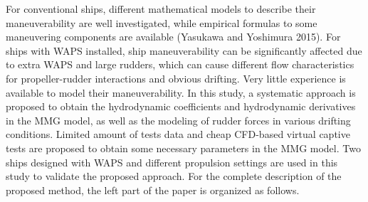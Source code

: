 For conventional ships, different mathematical models to describe their maneuverability are well investigated, while empirical formulas to some maneuvering components are available (Yasukawa and Yoshimura 2015). For ships with WAPS installed, ship maneuverability can be significantly affected due to extra WAPS and large rudders, which can cause different flow characteristics for propeller-rudder interactions and obvious drifting. Very little experience is available to model their maneuverability. In this study, a systematic approach is proposed to obtain the hydrodynamic coefficients and hydrodynamic derivatives in the MMG model, as well as the modeling of rudder forces in various drifting conditions. Limited amount of tests data and cheap CFD-based virtual captive tests are proposed to obtain some necessary parameters in the MMG model. Two ships designed with WAPS and different propulsion settings are used in this study to validate the proposed approach. For the complete description of the proposed method, the left part of the paper is organized as follows. 





